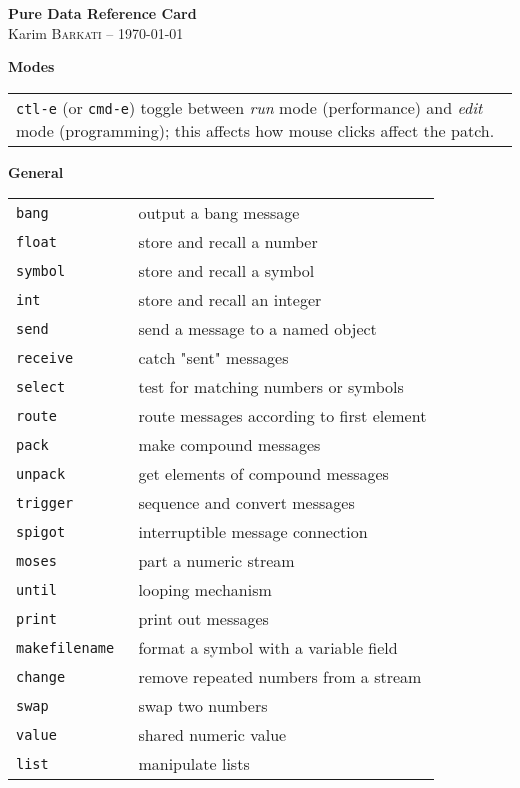 \documentclass[a4paper, landscape, 10pt]{article}
\newcommand{\refcardtitle}[1]{
  \begin{center}
    \textbf{\small{#1}}
  \end{center}
}
\begin{document}
\begin{multicols}{3}

  \begin{center}
    \Large{\textbf{Pure Data Reference Card}} \\
    \small{Karim \textsc{Barkati} -- \today} 
  \end{center}

  \footnotesize

  \refcardtitle{Modes}
  \begin{tabularx}{9.1cm}{X}
    \texttt{ctl-e} (or \texttt{cmd-e}) toggle between \emph{run} mode (performance) and \emph{edit} mode (programming); this affects how mouse clicks affect the patch.
  \end{tabularx}

  \refcardtitle{General}
  \begin{tabularx}{9cm}{>{\tt}l X}
    bang & output a bang message \\
    float & store and recall a number  \\
    symbol & store and recall a symbol \\
    int & store and recall an integer  \\
    send & send a message to a named object  \\
    receive & catch "sent" messages  \\
    select & test for matching numbers or symbols  \\
    route & route messages according to first element  \\
    pack & make compound messages  \\
    unpack & get elements of compound messages  \\
    trigger & sequence and convert messages  \\
    spigot & interruptible message connection  \\
    moses & part a numeric stream  \\
    until & looping mechanism  \\
    print & print out messages  \\
    makefilename & format a symbol with a variable field  \\
    change & remove repeated numbers from a stream  \\
    swap & swap two numbers  \\
    value & shared numeric value \\
    list & manipulate lists \\
  \end{tabularx}


\end{multicols}
\end{document}

